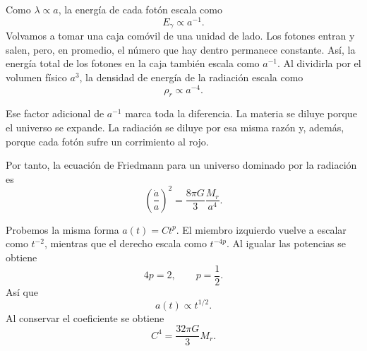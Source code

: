 Como \(\lambda\propto a\), la energía de cada fotón escala como
\begin{equation}
E_\gamma\propto a^{-1}.
\end{equation}
Volvamos a tomar una caja comóvil de una unidad de lado. Los fotones entran y salen, pero, en promedio, el número que hay dentro permanece constante. Así, la energía total de los fotones en la caja también escala como \(a^{-1}\). Al dividirla por el volumen físico \(a^3\), la densidad de energía de la radiación escala como
\begin{equation}
\rho_r\propto a^{-4}.
\end{equation}

Ese factor adicional de \(a^{-1}\) marca toda la diferencia. La materia se diluye porque el universo se expande. La radiación se diluye por esa misma razón y, además, porque cada fotón sufre un corrimiento al rojo.

Por tanto, la ecuación de Friedmann para un universo dominado por la radiación es
\begin{equation}
\left(\frac{\dot a}{a}\right)^2=\frac{8\pi G}{3}\frac{M_r}{a^4}.
\end{equation}

Probemos la misma forma \(a(t)=Ct^p\). El miembro izquierdo vuelve a escalar como \(t^{-2}\), mientras que el derecho escala como \(t^{-4p}\). Al igualar las potencias se obtiene
\begin{equation}
4p=2,
\qquad
p=\frac{1}{2}.
\end{equation}
Así que
\begin{equation}
a(t)\propto t^{1/2}.
\end{equation}
Al conservar el coeficiente se obtiene
\begin{equation}
C^4=\frac{32\pi G}{3}M_r.
\end{equation}

\begin{classroomqa}
\end{classroomqa}

